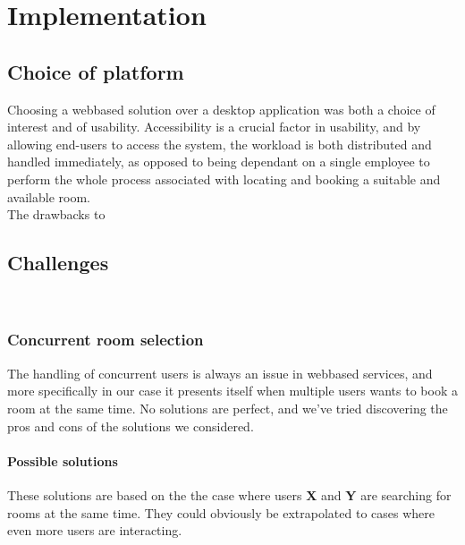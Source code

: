 \chapter{Implementation}

\section{Choice of platform}
Choosing a webbased solution over a desktop application was both a choice of interest and of usability. Accessibility is a crucial factor in usability, and by allowing end-users to access the system, the workload is both distributed and handled immediately, as opposed to being dependant on a single employee to perform the whole process associated with locating and booking a suitable and available room.
\\
The drawbacks to 


\section{Challenges}
\label{sec:challenges}
\\
\subsection{Concurrent room selection}
The handling of concurrent users is always an issue in webbased services, and more specifically in our case it presents itself when multiple users wants to book a room at the same time. No solutions are perfect, and we've tried discovering the pros and cons of the solutions we considered.

\subsubsection*{Possible solutions}
These solutions are based on the the case where users \textbf{X} and \textbf{Y} are searching for rooms at the same time. They could obviously be extrapolated to cases where even more users are interacting. 
